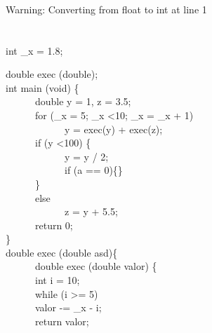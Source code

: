 \documentclass[tikz,border=10pt]{standalone}
\begin{document}
\phantom \\
\phantom \\
\phantom \\
Warning: Converting from float to int at line 1 \\

\\
\\

int \_x = 1.8;

double exec (double);\\

int main (void) \{\\

\ \ \ \ \ \    double y = 1, z = 3.5;\\

\ \ \ \ \ \    for (\_x = 5; \_x \textless 10; \_x = \_x + 1)\\

\ \ \ \ \ \    \ \ \ \ \ \    y = exec(y) + exec(z);\\

\ \ \ \ \ \    if (y \textless 100) \{\\

\ \ \ \ \ \    \ \ \ \ \ \    y = y / 2;\\

\ \ \ \ \ \      \ \ \ \ \ \  if (a == 0)\{\}\\

\ \ \ \ \ \   \}\\

 \ \ \ \ \ \   else\\

 \ \ \ \ \ \  \ \ \ \ \ \     z = y + 5.5;\\

\ \ \ \ \ \    return 0;\\

\} \\

double exec (double asd)\{\\

\ \ \ \ \ \ double exec (double valor) \{\\

 \ \ \ \ \ \    int i = 10;\\

\ \ \ \ \ \     while (i \textgreater = 5)\\

\ \ \ \ \ \         valor -= \_x - i;\\

\ \ \ \ \ \     return valor;\\
\end{document}

